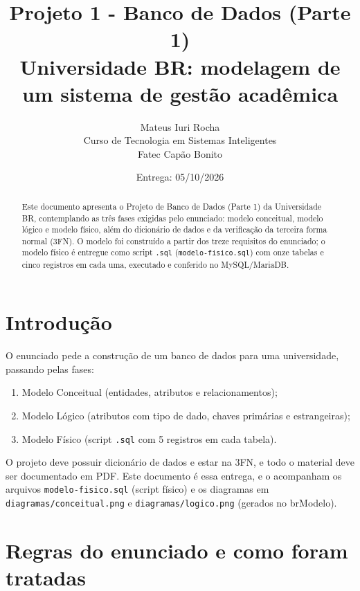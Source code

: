 \documentclass[12pt,a4paper]{article}
\title{\textbf{Projeto 1 - Banco de Dados (Parte 1)}\\[0.4em]
\normalsize Universidade BR: modelagem de um sistema de gestão acadêmica}
\author{Mateus Iuri Rocha\\[0.3em]
\normalsize Curso de Tecnologia em Sistemas Inteligentes\\
\normalsize Fatec Capão Bonito}
\date{Entrega: 05/10/2026}
\begin{document}
\maketitle

\begin{abstract}
Este documento apresenta o Projeto de Banco de Dados (Parte 1) da
Universidade BR, contemplando as três fases exigidas pelo enunciado:
modelo conceitual, modelo lógico e modelo físico, além do dicionário de
dados e da verificação da terceira forma normal (3FN). O modelo foi
construído a partir dos treze requisitos do enunciado; o modelo físico é
entregue como script \texttt{.sql} (\texttt{modelo-fisico.sql}) com onze
tabelas e cinco registros em cada uma, executado e conferido no
MySQL/MariaDB.
\end{abstract}

\tableofcontents

\section{Introdução}

O enunciado pede a construção de um banco de dados para uma universidade,
passando pelas fases:

\begin{enumerate}
  \item Modelo Conceitual (entidades, atributos e relacionamentos);
  \item Modelo Lógico (atributos com tipo de dado, chaves primárias e
        estrangeiras);
  \item Modelo Físico (script \texttt{.sql} com 5 registros em cada
        tabela).
\end{enumerate}

O projeto deve possuir dicionário de dados e estar na 3FN, e todo o
material deve ser documentado em PDF. Este documento é essa entrega, e o
acompanham os arquivos \texttt{modelo-fisico.sql} (script físico) e os diagramas em
\texttt{diagramas/conceitual.png} e \texttt{diagramas/logico.png}
(gerados no brModelo).

\section{Regras do enunciado e como foram tratadas}
\end{document}

